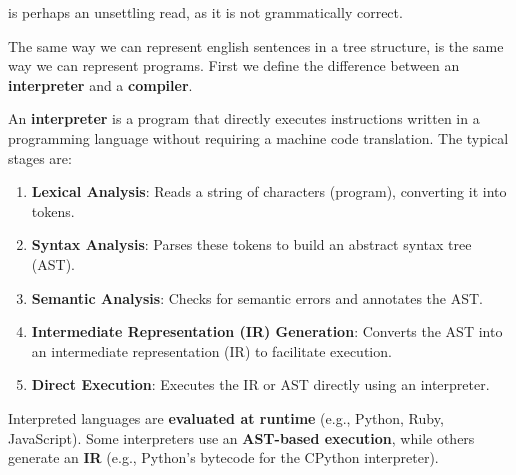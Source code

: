 \noindent
is perhaps an unsettling read, as it is not grammatically correct. \\

\newpage 

\noindent
The same way we can represent english sentences in a tree structure, is the same way we can represent programs. First 
we define the difference between an \textbf{interpreter} and a \textbf{compiler}.

\begin{Def}[Interpreter]

    An \textbf{interpreter} is a program that directly executes instructions written in a programming language without 
    requiring a machine code translation. The typical stages are:
    
    \begin{enumerate}
        \item \textbf{Lexical Analysis}: Reads a string of characters (program), converting it into tokens.
        \item \textbf{Syntax Analysis}: Parses these tokens to build an abstract syntax tree (AST).
        \item \textbf{Semantic Analysis}: Checks for semantic errors and annotates the AST.
        \item \textbf{Intermediate Representation (IR) Generation}: Converts the AST into an intermediate representation (IR) to facilitate execution.
        \item \textbf{Direct Execution}: Executes the IR or AST directly using an interpreter.
    \end{enumerate}
    
    \noindent
    Interpreted languages are \textbf{evaluated at runtime} (e.g., Python, Ruby, JavaScript). Some interpreters use an \textbf{AST-based execution}, while others generate an \textbf{IR} (e.g., Python's bytecode for the CPython interpreter).
    
    \end{Def}
    

